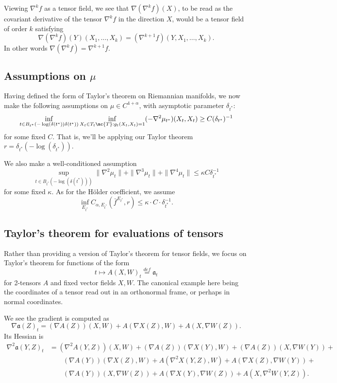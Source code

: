 \documentclass{article}
\begin{document}
Viewing $\nabla^{k} f$ as a tensor field, we see that $\nabla ( \nabla^k f)(X)$, to be read as the covariant derivative of the tensor $\nabla^k f$ in the direction
$X$, would be a tensor field of order $k$ satisfying
$$
\nabla(\nabla^k f)(Y)(X_1, \dots, X_k) = (\nabla^{k+1} f)(Y, X_1, \dots, X_k).
$$
In other words $\nabla (\nabla^k f) = \nabla^{k+1} f$.

\subsection{Assumptions on $\mu$}

Having defined the form of Taylor's theorem on Riemannian manifolds, 
we now make the following assumptions on $\mu \in C^{4+\alpha}$, with asymptotic parameter $\delta_{t^*}$:
$$
\inf_{t \in B_{t^*}(-\log(\delta(t^*)) \delta(t^*))} \inf_{X_t \in T_t\mc{T}: g_t(X_t,X_t)=1} (-\nabla^2 \mu_{t^*})(X_t, X_t) \geq C (\delta_{t^*})^{-1}
$$
for some fixed $C$. That is, we'll be applying our Taylor theorem $r=\delta_{t^*}(-\log(\delta_{t^*}))$.

  We also make a well-conditioned assumption 
  $$
\sup_{t \in B_{t^*}(-\log(\delta(t^*)))} \|\nabla^2 \mu_t\| + \|\nabla^3 \mu_t\| + \|\nabla^4 \mu_t\| \leq \kappa C \delta_{t^*}^{-1}
  $$
for some fixed $\kappa$. As for the H\"older coefficient, we assume
$$\inf_{E_{t^*}} C_{\alpha, E_{t^*}}(\bar{f}^{E_{t^*}}, r) \leq \kappa \cdot C \cdot \delta_{t^*}^{-1}.$$


\subsection{Taylor's theorem for evaluations of tensors}

Rather than providing a version of Taylor's theorem for tensor fields, we focus on Taylor's theorem for functions of
the form
$$
t \mapsto A(X,W)_t \overset{def}{=} \mathfrak{a}_t
$$
for 2-tensors $A$ and fixed vector fields $X, W$. The canonical example here being the coordinates
of a tensor read out in an orthonormal frame, or perhaps in normal coordinates.

We see the gradient is computed as
$$
\nabla \mathfrak{a}(Z)_t = (\nabla A(Z))(X, W) + A(\nabla X(Z), W) + A(X, \nabla W(Z)).
$$
Its Hessian is
$$
\begin{aligned}
  \nabla^2 \mathfrak{a}(Y, Z)_t &= (\nabla^2 A(Y,Z))(X, W) + (\nabla A(Z))(\nabla X(Y), W) + (\nabla A(Z))(X, \nabla W(Y)) + \\
& \qquad  (\nabla A(Y))(\nabla X(Z), W) + A(\nabla^2 X(Y, Z), W) + A(\nabla X(Z), \nabla W(Y)) + \\
& \qquad  (\nabla A(Y))(X, \nabla W(Z)) + A(\nabla X(Y), \nabla W(Z)) + A(X, \nabla^2 W(Y, Z)).  \\
\end{aligned}
$$
\end{document}
